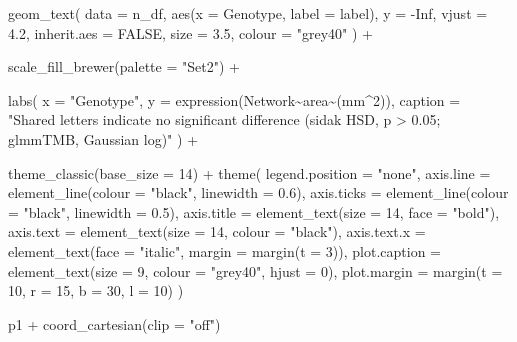 \documentclass[
  letterpaper,
  DIV=11,
  numbers=noendperiod]{scrartcl}
\newenvironment{Shaded}{\begin{snugshade}}{\end{snugshade}}
\newcommand{\AttributeTok}[1]{\textcolor[rgb]{0.40,0.45,0.13}{#1}}
\newcommand{\ConstantTok}[1]{\textcolor[rgb]{0.56,0.35,0.01}{#1}}
\newcommand{\DecValTok}[1]{\textcolor[rgb]{0.68,0.00,0.00}{#1}}
\newcommand{\FloatTok}[1]{\textcolor[rgb]{0.68,0.00,0.00}{#1}}
\newcommand{\FunctionTok}[1]{\textcolor[rgb]{0.28,0.35,0.67}{#1}}
\newcommand{\NormalTok}[1]{\textcolor[rgb]{0.00,0.23,0.31}{#1}}
\newcommand{\SpecialCharTok}[1]{\textcolor[rgb]{0.37,0.37,0.37}{#1}}
\newcommand{\StringTok}[1]{\textcolor[rgb]{0.13,0.47,0.30}{#1}}
\newcounter{none} %
\begin{document}
\begin{Shaded}
\begin{Highlighting}[]
  \FunctionTok{geom\_text}\NormalTok{(}
    \AttributeTok{data =}\NormalTok{ n\_df, }\FunctionTok{aes}\NormalTok{(}\AttributeTok{x =}\NormalTok{ Genotype, }\AttributeTok{label =}\NormalTok{ label),}
    \AttributeTok{y =} \SpecialCharTok{{-}}\ConstantTok{Inf}\NormalTok{, }\AttributeTok{vjust =} \FloatTok{4.2}\NormalTok{, }\AttributeTok{inherit.aes =} \ConstantTok{FALSE}\NormalTok{,}
    \AttributeTok{size =} \FloatTok{3.5}\NormalTok{, }\AttributeTok{colour =} \StringTok{"grey40"}
\NormalTok{  ) }\SpecialCharTok{+}

  \FunctionTok{scale\_fill\_brewer}\NormalTok{(}\AttributeTok{palette =} \StringTok{"Set2"}\NormalTok{) }\SpecialCharTok{+}
 
  \FunctionTok{labs}\NormalTok{(}
    \AttributeTok{x       =} \StringTok{"Genotype"}\NormalTok{,}
    \AttributeTok{y       =} \FunctionTok{expression}\NormalTok{(Network}\SpecialCharTok{\textasciitilde{}}\NormalTok{area}\SpecialCharTok{\textasciitilde{}}\NormalTok{(mm}\SpecialCharTok{\^{}}\DecValTok{2}\NormalTok{)),}
    \AttributeTok{caption =} \StringTok{"Shared letters indicate no significant difference (sidak HSD, p \textgreater{} 0.05; glmmTMB, Gaussian log)"}
\NormalTok{  ) }\SpecialCharTok{+}

  \FunctionTok{theme\_classic}\NormalTok{(}\AttributeTok{base\_size =} \DecValTok{14}\NormalTok{) }\SpecialCharTok{+}
  \FunctionTok{theme}\NormalTok{(}
    \AttributeTok{legend.position =} \StringTok{"none"}\NormalTok{,}
    \AttributeTok{axis.line       =} \FunctionTok{element\_line}\NormalTok{(}\AttributeTok{colour =} \StringTok{"black"}\NormalTok{, }\AttributeTok{linewidth =} \FloatTok{0.6}\NormalTok{),}
    \AttributeTok{axis.ticks      =} \FunctionTok{element\_line}\NormalTok{(}\AttributeTok{colour =} \StringTok{"black"}\NormalTok{, }\AttributeTok{linewidth =} \FloatTok{0.5}\NormalTok{),}
    \AttributeTok{axis.title      =} \FunctionTok{element\_text}\NormalTok{(}\AttributeTok{size =} \DecValTok{14}\NormalTok{, }\AttributeTok{face =} \StringTok{"bold"}\NormalTok{),}
    \AttributeTok{axis.text       =} \FunctionTok{element\_text}\NormalTok{(}\AttributeTok{size =} \DecValTok{14}\NormalTok{, }\AttributeTok{colour =} \StringTok{"black"}\NormalTok{),}
    \AttributeTok{axis.text.x     =} \FunctionTok{element\_text}\NormalTok{(}\AttributeTok{face =} \StringTok{"italic"}\NormalTok{, }\AttributeTok{margin =} \FunctionTok{margin}\NormalTok{(}\AttributeTok{t =} \DecValTok{3}\NormalTok{)),}
    \AttributeTok{plot.caption    =} \FunctionTok{element\_text}\NormalTok{(}\AttributeTok{size =} \DecValTok{9}\NormalTok{, }\AttributeTok{colour =} \StringTok{"grey40"}\NormalTok{, }\AttributeTok{hjust =} \DecValTok{0}\NormalTok{),}
    \AttributeTok{plot.margin     =} \FunctionTok{margin}\NormalTok{(}\AttributeTok{t =} \DecValTok{10}\NormalTok{, }\AttributeTok{r =} \DecValTok{15}\NormalTok{, }\AttributeTok{b =} \DecValTok{30}\NormalTok{, }\AttributeTok{l =} \DecValTok{10}\NormalTok{)}
\NormalTok{  )}

\NormalTok{p1 }\SpecialCharTok{+} \FunctionTok{coord\_cartesian}\NormalTok{(}\AttributeTok{clip =} \StringTok{"off"}\NormalTok{)}
\end{Highlighting}
\end{Shaded}
\end{document}
